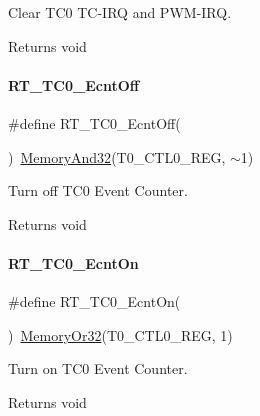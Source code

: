 Clear T\+C0 T\+C-\/\+I\+RQ and P\+W\+M-\/\+I\+RQ. 

\begin{DoxyReturn}{Returns}
void 
\end{DoxyReturn}
\mbox{\label{a00041_a2c4dcae7aa5753dc38986240b024888f}} 
\paragraph{\texorpdfstring{R\+T\+\_\+\+T\+C0\+\_\+\+Ecnt\+Off}{RT\_TC0\_EcntOff}}
{\footnotesize\ttfamily \#define R\+T\+\_\+\+T\+C0\+\_\+\+Ecnt\+Off(\begin{DoxyParamCaption}{ }\end{DoxyParamCaption})~\mbox{\hyperlink{a00020_a5c1a2bd4c1bd4c2f429d8042a45327ff}{Memory\+And32}}(T0\+\_\+\+C\+T\+L0\+\_\+\+R\+EG, $\sim$1)}



Turn off T\+C0 Event Counter. 

\begin{DoxyReturn}{Returns}
void 
\end{DoxyReturn}
\mbox{\label{a00041_a4dd8c922ad55805d587d5a73b78d911a}} 
\paragraph{\texorpdfstring{R\+T\+\_\+\+T\+C0\+\_\+\+Ecnt\+On}{RT\_TC0\_EcntOn}}
{\footnotesize\ttfamily \#define R\+T\+\_\+\+T\+C0\+\_\+\+Ecnt\+On(\begin{DoxyParamCaption}{ }\end{DoxyParamCaption})~\mbox{\hyperlink{a00020_a9ea92ebccdef6bdaca4d00210cc7266d}{Memory\+Or32}}(T0\+\_\+\+C\+T\+L0\+\_\+\+R\+EG, 1)}



Turn on T\+C0 Event Counter. 

\begin{DoxyReturn}{Returns}
void 
\end{DoxyReturn}
\mbox{\label{a00041_aa62df019b0279e8510e465f5e920f555}} 
